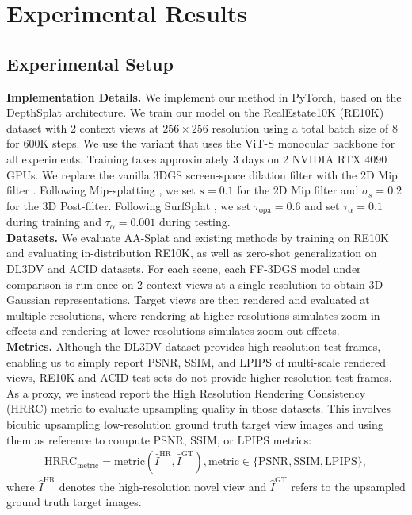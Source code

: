 \documentclass[runningheads]{llncs}
\begin{document}
\section{Experimental Results}
\label{sec:results}

\subsection{Experimental Setup}
\label{sec:implementation-details}
\noindent \textbf{Implementation Details.}
We implement our method in PyTorch, based on the DepthSplat \cite{xu2025depthsplat} architecture. We train our model on the RealEstate10K (RE10K) \cite{zhou2018stereo} dataset with 2 context views at $256\times256$ resolution using a total batch size of 8 for 600K steps.
We use the variant that uses the ViT-S monocular backbone for all experiments. Training takes approximately 3 days on 2 NVIDIA RTX 4090 GPUs.
We replace the vanilla 3DGS screen-space dilation filter \cite{kerbl20233d} with the 2D Mip filter \cite{yu2024mip}. Following Mip-splatting \cite{yu2024mip}, we set $s=0.1$ for the 2D Mip filter and $\sigma_s=0.2$ for the 3D Post-filter. Following SurfSplat \cite{he2026surfsplat}, we set $\tau_\text{opa}=0.6$ and set $\tau_\alpha=0.1$ during training and $\tau_\alpha=0.001$ during testing.\\

\noindent \textbf{Datasets.}
We evaluate AA-Splat and existing methods by training on RE10K \cite{zhou2018stereo} and evaluating in-distribution RE10K, as well as zero-shot generalization on DL3DV \cite{ling2024dl3dv} and ACID \cite{liu2021infinite} datasets.
For each scene, each FF-3DGS model under comparison is run once on 2 context views at a single resolution to obtain 3D Gaussian representations. Target views are then rendered and evaluated at multiple resolutions, where rendering at higher resolutions simulates zoom-in effects and rendering at lower resolutions simulates zoom-out effects.\\

\noindent \textbf{Metrics.}
Although the DL3DV \cite{ling2024dl3dv} dataset provides high-resolution test frames, enabling us to simply report PSNR, SSIM, and LPIPS of multi-scale rendered views, RE10K and ACID test sets do not provide higher-resolution test frames. As a proxy, we instead report the High Resolution Rendering Consistency (HRRC) metric \cite{he2026surfsplat} to evaluate upsampling quality in those datasets. This involves bicubic upsampling low-resolution ground truth target view images and using them as reference to compute PSNR, SSIM, or LPIPS \cite{zhang2018unreasonable} metrics:
\begin{equation}
  \begin{split}
  \text{HRRC}_\text{metric}=\text{metric}(\hat{I}^\text{HR}, \hat{I}^\text{GT}), \text{metric}\in\{\text{PSNR}, \text{SSIM}, \text{LPIPS}\},
  \end{split}
  \label{eq:hrrc}
\end{equation}
where $\hat{I}^\text{HR}$ denotes the high-resolution novel view and $\hat{I}^\text{GT}$ refers to the upsampled ground truth target images.
\end{document}

